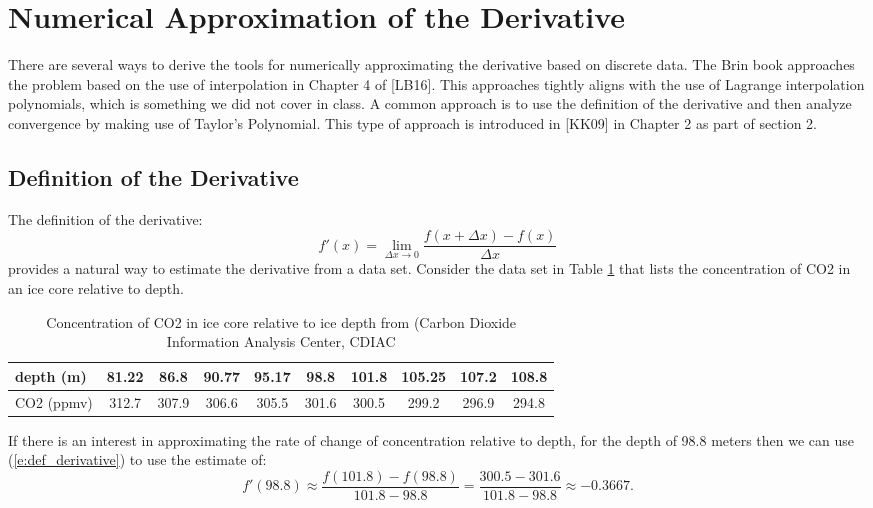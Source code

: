 \documentclass[twoside]{article}
\renewcommand{\cite}[1]{[#1]}
\begin{document}
\section{Numerical Approximation of the Derivative}
There are several ways to derive the tools for numerically approximating the derivative based on discrete data. The Brin book approaches the problem based on the use of interpolation in Chapter 4 of \cite{LB16}. This approaches tightly aligns with the use of Lagrange interpolation polynomials, which is something we did not cover in class. A common approach is to use the definition of the derivative and then analyze convergence by making use of Taylor's Polynomial. This type of approach is introduced in \cite{KK09} in Chapter 2 as part of section 2. 
\subsection{Definition of the Derivative}
The definition of the derivative:
\begin{equation}
    f'(x) = \lim_{\Delta x\rightarrow 0}\frac {f(x+\Delta x)-f(x)}{\Delta x}
    \label{e:def_derivative}
\end{equation}
provides a natural way to estimate the derivative from a data set. Consider the data set in Table \ref{T:ice_CO2} that lists the concentration of CO2 in an ice core relative to depth. 
\begin{table}[h]
\begin{center}
\begin{tabular}{|l|c|c|c|c|c|c|c||c|c|}
\hline
depth (m) & 81.22 & 86.8 & 90.77 & 95.17 & 98.8 & 101.8 & 105.25 & 107.2 & 108.8\\
\hline
CO2 (ppmv) & 312.7 & 307.9 & 306.6 & 305.5 & 301.6 & 300.5 & 299.2  & 296.9 & 294.8 \\
\hline
\end{tabular}

    \caption{Concentration of CO2 in ice core relative to ice depth from (Carbon Dioxide Information Analysis Center, CDIAC}
    \end{center}
    \label{T:ice_CO2}
\end{table}
If there is an interest in approximating the rate of change of concentration relative to depth, for the depth of 98.8 meters then we can use (\ref{e:def_derivative}) to use the estimate of:
$$f'(98.8) \approx \frac {f(101.8)-f(98.8)}{101.8-98.8}=\frac{300.5-301.6}{101.8-98.8}\approx -0.3667. $$
\end{document}
